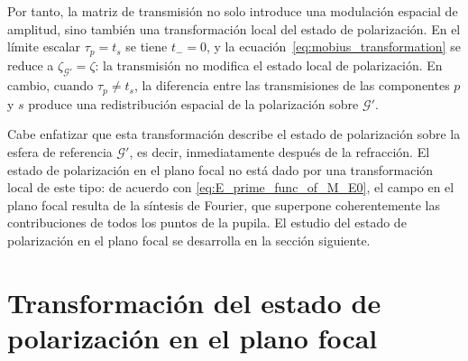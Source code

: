 Por tanto, la matriz de transmisión no solo introduce una modulación espacial
de amplitud, sino también una transformación local del estado de polarización.
En el límite escalar $\tau_p=t_s$ se tiene $t_-=0$, y la
ecuación~\eqref{eq:mobius_transformation} se reduce a
$\zeta_{\mathscr{G}'}=\zeta$: la transmisión no modifica el estado local de
polarización. En cambio, cuando $\tau_p\neq t_s$, la diferencia entre las
transmisiones de las componentes $p$ y $s$ produce una redistribución espacial
de la polarización sobre $\mathscr{G}'$.

Cabe enfatizar que esta transformación describe el estado de polarización
sobre la esfera de referencia $\mathscr{G}'$, es decir, inmediatamente después
de la refracción. El estado de polarización en el plano focal no está dado por
una transformación local de este tipo: de acuerdo con
\eqref{eq:E_prime_func_of_M_E0}, el campo en el plano focal resulta de la
síntesis de Fourier, que superpone coherentemente las contribuciones de todos
los puntos de la pupila. El estudio del estado de polarización en el plano
focal se desarrolla en la sección siguiente.

\section{Transformación del estado de polarización en el plano focal}
\label{subsec:polarizacion_plano_focal}

